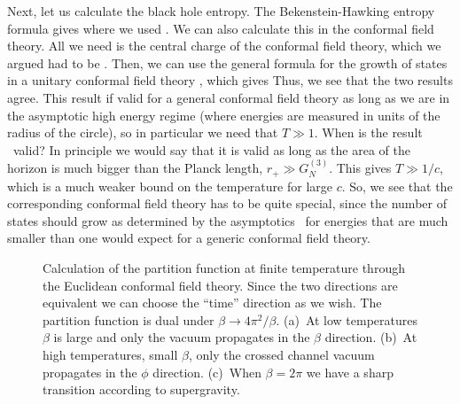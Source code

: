 Next, let us calculate the black hole entropy. The Bekenstein-Hawking
entropy formula gives 
where we used \brown . 
We can also calculate this in the conformal field theory.
All we need is the central charge of the conformal field theory,
which we argued had to be \brown .
 Then, we can use the general formula \cite{Cardy:1986ie} for the 
growth of states in a unitary conformal field theory 
\cite{Strominger:1998eq,Maldacena:1998bw}, which gives
Thus, we see that the two results agree.
This result if valid for a general conformal field theory 
 as long as we are in the asymptotic high energy
regime (where energies are measured in units of the radius of the
circle), so in particular we need that  $ T \gg 1$. 
When is the result \entgra\ valid? In principle we would say that
it is valid as long as the area of the horizon is much bigger than
the Planck length, $ r_+ \gg G_N^{(3)}$. This gives 
$T \gg 1/c$, which is a much weaker bound on the 
temperature for large $c$.
So, we see that the corresponding
conformal field theory has to be quite special,
since the number of states should grow as determined by the asymptotics
\entcft\ for energies that are much smaller than one would expect 
for a generic  conformal field theory. 

\begin{figure}[htb]
\begin{center}
\epsfxsize=4.5in\leavevmode{}
\end{center}
\caption{
Calculation of the partition function at finite temperature 
through the Euclidean conformal field theory. Since the two directions
are equivalent we can choose the ``time'' direction as we wish.
The partition function is dual under $ \beta \to 4 \pi^2/\beta$.
 (a)~At low temperatures
$ \beta $ is large and only the vacuum propagates in the $\beta $
 direction. (b)~At high temperatures, small $\beta$, only the 
crossed channel vacuum propagates in the $\phi$ direction. 
(c)~When $\beta =2 \pi$ we have a sharp transition according to 
supergravity.
}
\label{rectang}
\end{figure}
 

